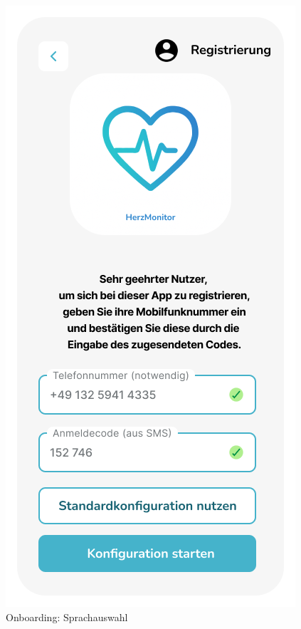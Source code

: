\begin{figure}[h!]
\begin{minipage}{0.3\linewidth}
		\caption{Onboarding: Sprachauswahl}
		\label{fig:sprachauswahl}
	\end{minipage}%
	\hfill
	\begin{minipage}{0.3\linewidth}
		\centering
		\includegraphics[width=\linewidth]{images/Registrierung}

\end{minipage}
\end{figure}
